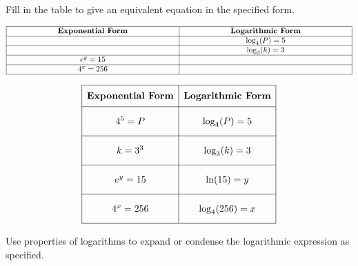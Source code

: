 \documentclass[addpoints]{exam}
\begin{document}
\begin{questions}
\question[5] Fill in the table to give an equivalent equation in the specified form.\\
\begin{center} {\renewcommand{\arraystretch}{3}
\[
\begin{array}{|c|c|} \hline  \textbf{Exponential Form} & \textbf{Logarithmic Form} \\ \hline  \hspace{75mm} & \log_{4}(P) = 5 \\ \hline  \hspace{75mm} & \log_{3}(k) = 3 \\ \hline  e^{y} = 15 & \hspace{75mm} \\ \hline  4^{x} = 256 & \hspace{75mm} \\ \hline \end{array}
\]
}\end{center}
\begin{solution}
\[\begin{array}{|c|c|} \hline \rule[-0.8em]{0pt}{2.2em} \textbf{Exponential Form} & \textbf{Logarithmic Form} \\ \hline \rule[-1.2em]{0pt}{3em} 4^{5} = P & \log_{4}(P) = 5 \\ \hline \rule[-1.2em]{0pt}{3em} k = 3^{3} & \log_{3}(k) = 3 \\ \hline \rule[-1.2em]{0pt}{3em} e^{y} = 15 & \ln(15) = y \\ \hline \rule[-1.2em]{0pt}{3em} 4^{x} = 256 & \log_{4}(256) = x \\ \hline \end{array}\]
\end{solution}

\question Use properties of logarithms to expand or condense the logarithmic expression as specified.
\end{questions}
\end{document}
